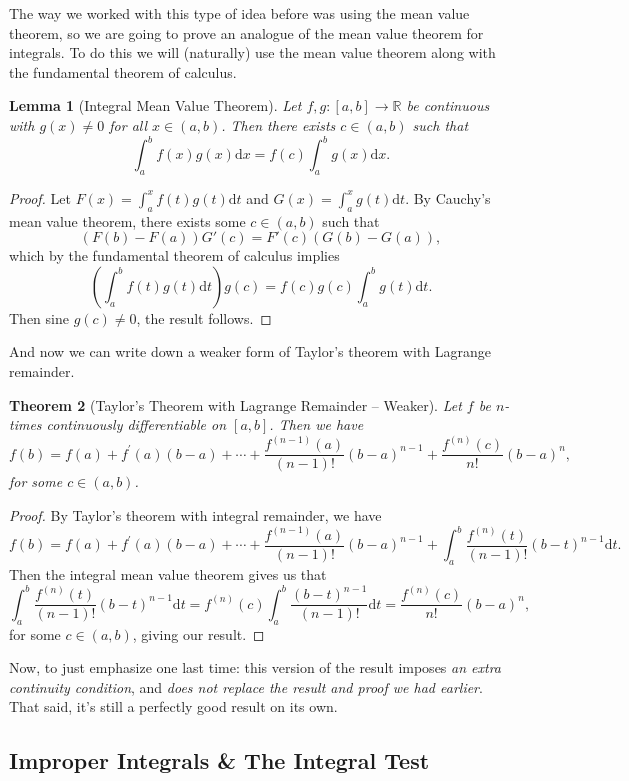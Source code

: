 \documentclass[11pt, a4paper]{article}
\newtheorem{theorem}{Theorem}[section]
\newtheorem{lemma}[theorem]{Lemma}
\theoremstyle{definition}
\newcommand{\R}{\mathbb{R}}
\newcommand{\dd}{\mathrm{d}}
\begin{document}
The way we worked with this type of idea before was using the mean value theorem, so we are going to prove an analogue of the mean value theorem for integrals. To do this we will (naturally) use the mean value theorem along with the fundamental theorem of calculus.


\begin{lemma}[Integral Mean Value Theorem]
	Let $f, g : [a, b] \rightarrow \R$ be continuous with $g(x) \neq 0$ for all $x \in (a, b)$. Then there exists $c \in (a, b)$ such that
	$$
	\int_a^b f(x) g(x) \dd x = f(c) \int_a^b g(x) \dd x.
	$$
\end{lemma}
\begin{proof}
	Let $F(x) = \int_a^x f(t) g(t) \dd t$ and $G(x) = \int_a^x g(t) \dd t$.
	By Cauchy's mean value theorem, there exists some $c \in (a, b)$ such that
	$$
	(F(b) - F(a))G'(c) = F'(c)(G(b) - G(a)),
	$$
	which by the fundamental theorem of calculus implies
	$$
	\left(\int_a^b f(t) g(t) \dd t\right)g(c) = f(c) g(c) \int_a^b g(t) \dd t.
	$$
	Then sine $g(c) \neq 0$, the result follows.
\end{proof}


And now we can write down a weaker form of Taylor's theorem with Lagrange remainder.

\begin{theorem}[Taylor's Theorem with Lagrange Remainder -- Weaker]
	Let $f$ be $n$-times continuously differentiable on $[a, b]$. Then we have
	$$
	f(b)=f(a)+f^{\prime}(a)(b-a)+\cdots+\frac{f^{(n-1)}(a)}{(n-1) !}(b-a)^{n-1}+\frac{f^{(n)}(c)}{n !}(b-a)^{n},
	$$
	for some $c \in (a, b)$.
\end{theorem}
\begin{proof}
	By Taylor's theorem with integral remainder, we have
	$$
	f(b)=f(a)+f^{\prime}(a)(b-a)+\cdots+\frac{f^{(n-1)}(a)}{(n-1) !}(b-a)^{n-1}+\int_{a}^{b} \frac{f^{(n)}(t)}{(n-1) !}(b-t)^{n-1} \dd t.
	$$
	Then the integral mean value theorem gives us that
	$$
	\int_{a}^{b} \frac{f^{(n)}(t)}{(n-1) !}(b-t)^{n-1} \dd t = f^{(n)}(c) \int_{a}^{b} \frac{(b-t)^{n-1}}{(n-1) !} \dd t = \frac{f^{(n)}(c)}{n!}(b - a)^n, 
	$$
	for some $c \in (a, b)$, giving our result.
\end{proof}

Now, to just emphasize one last time: this version of the result imposes \emph{an extra continuity condition}, and \emph{does not replace the result and proof we had earlier}. That said, it's still a perfectly good result on its own.

\subsection{Improper Integrals \& The Integral Test}
\end{document}
